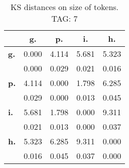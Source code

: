 \begin{table}[h!]
\begin{center}
\begin{tabular}{| l || c | c | c | c |}\hline
 & {\bf g.} & {\bf p.} & {\bf i.} & {\bf h.} \\\hline\hline
{\bf g.} & 0.000 & 4.114 & 5.681 & 5.323 \\
{\bf } & 0.000 & 0.029 & 0.021 & 0.016 \\\hline
{\bf p.} & 4.114 & 0.000 & 1.798 & 6.285 \\
{\bf } & 0.029 & 0.000 & 0.013 & 0.045 \\\hline
{\bf i.} & 5.681 & 1.798 & 0.000 & 9.311 \\
{\bf } & 0.021 & 0.013 & 0.000 & 0.037 \\\hline
{\bf h.} & 5.323 & 6.285 & 9.311 & 0.000 \\
{\bf } & 0.016 & 0.045 & 0.037 & 0.000 \\\hline
\end{tabular}
\caption{KS distances on size of tokens. TAG: 7}
\end{center}
\end{table}